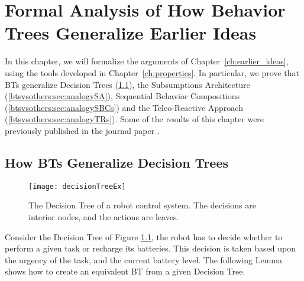
\chapter{Formal Analysis of How Behavior Trees  Generalize Earlier Ideas}
\label{chap:btsvsothers}
\label{ch:btsvsothers}
\graphicspath{{btsvsothers/figures/}}
In this chapter, we will formalize the arguments of Chapter~\ref{ch:earlier_ideas}, using the tools developed in Chapter~\ref{ch:properties}.
In particular, we prove that BTs generalize Decision Trees (\ref{btsvsothers:sec:analogyDTs}), the Subsumptions Architecture (\ref{btsvsothers:sec:analogySA}), Sequential Behavior Compositions (\ref{btsvsothers:sec:analogySBCs}) and the Teleo-Reactive Approach (\ref{btsvsothers:sec:analogyTRs}).
Some of the results of this chapter were previously published in the journal paper \cite{colledanchise2017behavior}.





\section{How BTs Generalize Decision Trees}
\label{btsvsothers:sec:analogyDTs}

\begin{figure}[htbp]
\begin{center}
\texttt{[image: decisionTreeEx]}
\caption{The Decision Tree of a robot control system. The decisions are interior nodes, and the actions are leaves. }
\label{btsvsothers:fig:decisionTreeEx}
\end{center}
\end{figure}


Consider the Decision Tree of Figure  \ref{btsvsothers:fig:decisionTreeEx}, the robot has to decide whether to perform a given task or recharge its batteries. This decision is taken based upon the urgency of the task, and the current battery level.
The following Lemma shows how to create an equivalent BT from a given Decision Tree.

